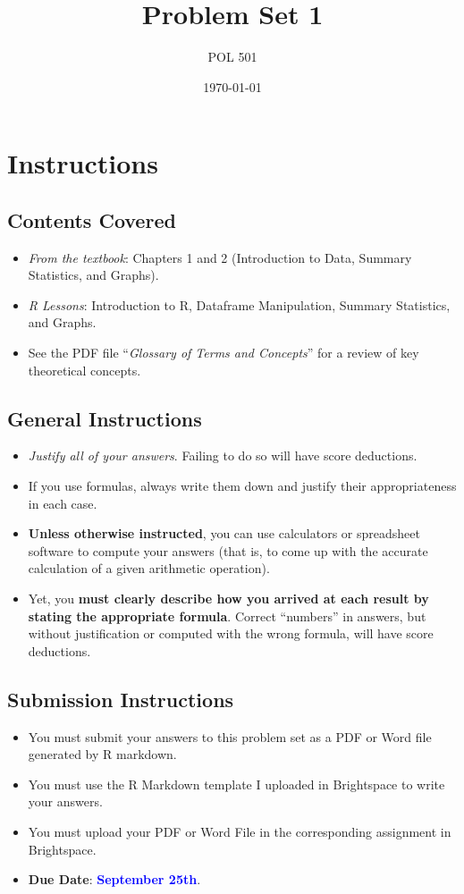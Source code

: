 \documentclass[11pt]{article}
\title{Problem Set 1}
\author{POL 501}
\date{\today}
\begin{document}
\maketitle

\section*{Instructions}
\subsection*{Contents Covered}
\begin{itemize}
    \item \emph{From the textbook}: Chapters 1 and 2 (Introduction to Data, Summary Statistics, and Graphs).
    \item \emph{R Lessons}: Introduction to R, Dataframe Manipulation, Summary Statistics, and Graphs. 
    \item See the PDF file ``\emph{Glossary of Terms and Concepts}'' for a review of key theoretical concepts.
\end{itemize}
\subsection*{General Instructions}
\begin{itemize}
    \item \emph{Justify all of your answers}. Failing to do so will have score deductions.
    \item If you use formulas, always write them down and justify their appropriateness in each case.
    \item \textbf{Unless otherwise instructed}, you can use calculators or spreadsheet software to compute your answers (that is, to come up with the accurate calculation of a given arithmetic operation). 
    \item Yet, you \textbf{must clearly describe how you arrived at each result by stating the appropriate formula}. Correct ``numbers'' in answers, but without justification or computed with the wrong formula, will have score deductions.
\end{itemize}
\subsection*{Submission Instructions}
\begin{itemize}
    \item You must submit your answers to this problem set as a PDF or Word file generated by R markdown.
    \item You must use the R Markdown template I uploaded in Brightspace to write your answers.
    \item You must upload your PDF or Word File in the corresponding assignment in Brightspace.
    \item \textbf{Due Date}: \textcolor{blue}{\textbf{September 25th}}.
\end{itemize}
\end{document}
